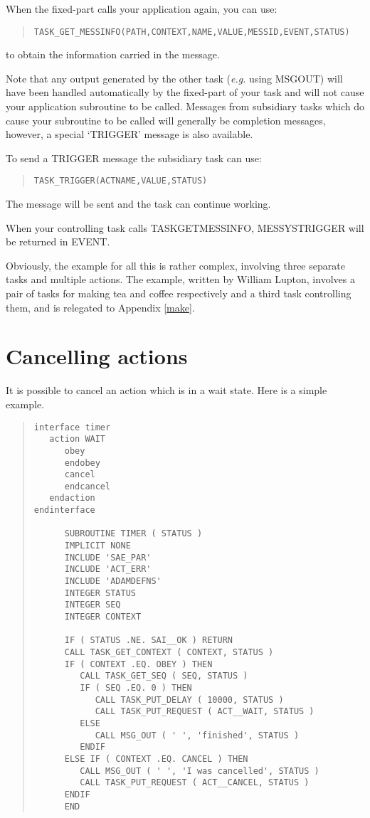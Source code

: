 \documentclass[twoside,11pt]{article}
\newcommand{\xlabel}[1]{}
\renewcommand{\_}{\texttt{\symbol{95}}}
\begin{document}
When the fixed-part calls your application again, you can use:
\small \begin{quote} \begin{verbatim}
TASK_GET_MESSINFO(PATH,CONTEXT,NAME,VALUE,MESSID,EVENT,STATUS)
\end{verbatim} \end{quote} \normalsize
to obtain the information carried in the message.

Note that any output generated by the other task ({\em e.g.} using MSG\_OUT)
will have been handled automatically by the fixed-part of your task and will
not cause your application subroutine to be called.
Messages from subsidiary tasks which do cause your subroutine to be called
will generally be completion messages, however, a special `TRIGGER' message is
also available.

To send a TRIGGER message the subsidiary task can use:
\small \begin{quote} \begin{verbatim}
TASK_TRIGGER(ACTNAME,VALUE,STATUS)
\end{verbatim} \end{quote} \normalsize
The message will be sent and the task can continue working.

When your controlling task calls TASK\_GET\_MESSINFO, MESSYS\_\_TRIGGER will
be returned in EVENT.

Obviously, the example for all this is rather complex, involving three
separate tasks and multiple actions. The example, written by William
Lupton, involves a pair of tasks for making tea and coffee respectively
and a third task controlling them, and is relegated to Appendix \ref{make}.

\section{Cancelling actions\xlabel{cancelling_actions}}

It is possible to cancel an action which is in a wait state. Here is a
simple example.

\small \begin{quote} \begin{verbatim}
interface timer
   action WAIT
      obey
      endobey
      cancel
      endcancel
   endaction
endinterface

      SUBROUTINE TIMER ( STATUS )
      IMPLICIT NONE
      INCLUDE 'SAE_PAR'
      INCLUDE 'ACT_ERR'
      INCLUDE 'ADAMDEFNS'
      INTEGER STATUS
      INTEGER SEQ
      INTEGER CONTEXT

      IF ( STATUS .NE. SAI__OK ) RETURN
      CALL TASK_GET_CONTEXT ( CONTEXT, STATUS )
      IF ( CONTEXT .EQ. OBEY ) THEN
         CALL TASK_GET_SEQ ( SEQ, STATUS )
         IF ( SEQ .EQ. 0 ) THEN
            CALL TASK_PUT_DELAY ( 10000, STATUS )
            CALL TASK_PUT_REQUEST ( ACT__WAIT, STATUS )
         ELSE
            CALL MSG_OUT ( ' ', 'finished', STATUS )
         ENDIF
      ELSE IF ( CONTEXT .EQ. CANCEL ) THEN
         CALL MSG_OUT ( ' ', 'I was cancelled', STATUS )
         CALL TASK_PUT_REQUEST ( ACT__CANCEL, STATUS )
      ENDIF
      END
\end{verbatim} \end{quote} \normalsize
\end{document}

